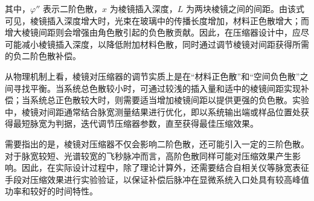 其中，$\varphi''$ 表示二阶色散，$x$ 为棱镜插入深度，$L$ 为两块棱镜之间的间距。由该式可见，棱镜插入深度增大时，光束在玻璃中的传播长度增加，材料正色散增大；而增大棱镜间距则会增强由角色散引起的负色散贡献。因此，在压缩器设计中，应尽可能减小棱镜插入深度，以降低附加材料色散，同时通过调节棱镜对间距获得所需的负二阶色散补偿。

从物理机制上看，棱镜对压缩器的调节实质上是在``材料正色散''和``空间负色散''之间寻找平衡。当系统总色散较小时，可通过较浅的插入量和适中的棱镜间距实现补偿；当系统总正色散较大时，则需要适当增加棱镜间距以提供更强的负色散。实验中，棱镜对间距通常结合脉宽测量结果进行优化，即以系统输出端或样品位置处获得最短脉宽为判据，迭代调节压缩器参数，直至获得最佳压缩效果。

需要指出的是，棱镜对压缩器不仅会影响二阶色散，还可能引入一定的三阶色散。对于脉宽较短、光谱较宽的飞秒脉冲而言，高阶色散同样可能对压缩效果产生影响。因此，在实际设计过程中，除了理论计算外，还需要结合自相关仪等脉宽表征手段对压缩效果进行实验验证，以保证补偿后脉冲在显微系统入口处具有较高峰值功率和较好的时间特性。




